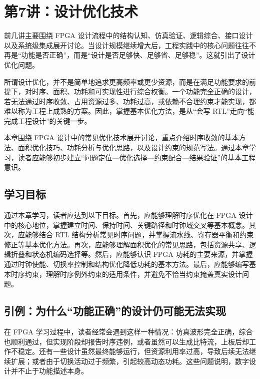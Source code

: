 \chapter{第7讲：设计优化技术}\label{ux7b2c7ux8bb2ux8bbeux8ba1ux4f18ux5316ux6280ux672f}

前几讲主要围绕 FPGA
设计流程中的结构认知、仿真验证、逻辑综合、接口设计以及系统级集成展开讨论。当设计规模继续增大后，工程实践中的核心问题往往不再是``功能是否正确''，而是``设计是否足够快、足够省、足够稳''。这就引出了设计优化问题。

所谓设计优化，并不是简单地追求更高频率或更少资源，而是在满足功能要求的前提下，对时序、面积、功耗和可实现性进行综合权衡。一个功能完全正确的设计，若无法通过时序收敛、占用资源过多、功耗过高，或依赖不合理约束才能实现，都难以称为工程上成熟的方案。因此，掌握基本优化方法，是从``会写
RTL''走向``能完成工程设计''的关键一步。

本章围绕 FPGA
设计中的常见优化技术展开讨论，重点介绍时序收敛的基本方法、面积优化技巧、功耗分析与优化思路，以及设计约束的规范写法。通过本章学习，读者应能够初步建立``问题定位---优化选择---约束配合---结果验证''的基本工程意识。

\section{学习目标}\label{ux5b66ux4e60ux76eeux6807}

通过本章学习，读者应达到以下目标。首先，应能够理解时序优化在 FPGA
设计中的核心地位，掌握建立时间、保持时间、关键路径和时钟域交叉等基本概念。其次，应能够结合
RTL
结构分析常见时序问题，并掌握流水线、寄存器平衡和约束修正等基本优化方法。再次，应能够理解面积优化的常见思路，包括资源共享、逻辑折叠和状态机编码选择等。然后，应能够认识
FPGA
功耗的主要来源，并掌握通过时钟使能、切换率控制和结构优化降低功耗的基本方法。最后，应能够编写基本时序约束，理解时序例外约束的适用条件，并避免不恰当约束掩盖真实设计问题。

\section{引例：为什么``功能正确''的设计仍可能无法实现}\label{ux5f15ux4f8bux4e3aux4ec0ux4e48ux529fux80fdux6b63ux786eux7684ux8bbeux8ba1ux4ecdux53efux80fdux65e0ux6cd5ux5b9eux73b0}

在 FPGA
学习过程中，读者经常会遇到这样一种情况：仿真波形完全正确，综合也顺利通过，但实现阶段却报告时序违例，或者虽然可以生成比特流，上板后却工作不稳定。还有一些设计虽然最终能够运行，但资源利用率过高，导致后续无法继续扩展；或者由于切换活动过于频繁，引起较高动态功耗。这些问题说明，数字设计并不止于功能描述本身。

